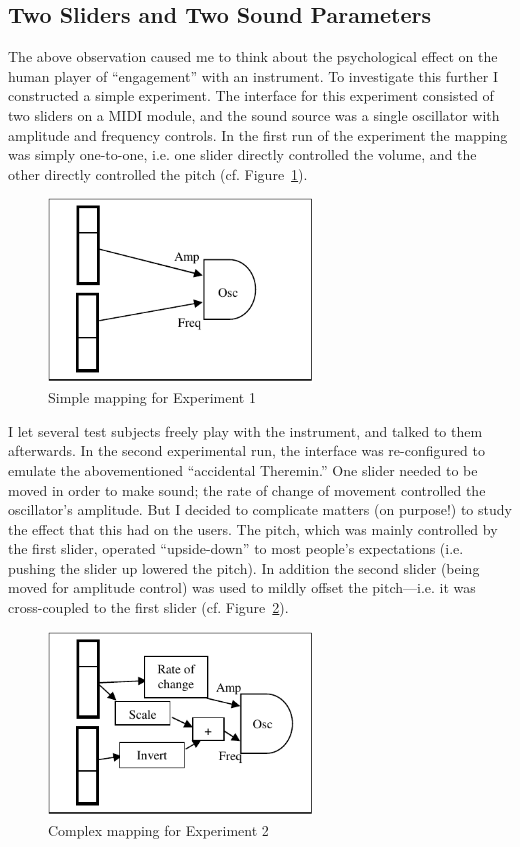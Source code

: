 \subsection{Two Sliders and Two Sound Parameters }

The above observation caused me to think about the psychological effect on the
human player of ``engagement'' with an instrument.
To investigate this further I constructed a simple experiment. The interface for
this experiment consisted of two sliders on a MIDI module, and the sound source
was a single oscillator with amplitude and frequency controls.  In the first run
of the experiment the mapping was simply one-to-one, i.e. one slider directly
controlled the volume, and the other directly controlled the pitch (cf. Figure~\ref{Hunt:img-6}).

\begin{figure}[t]
\centering
\includegraphics[width=70mm]{img-6-eps-converted-to-crop.pdf}
\caption{Simple mapping for Experiment 1}
\label{Hunt:img-6}       %
\end{figure}

I let several test subjects freely play with the instrument, and talked to them
afterwards.  In the second experimental run, the interface was re-configured to
emulate the abovementioned ``accidental Theremin.''  One slider needed to be moved
in order to make sound; the rate of change of movement controlled the
oscillator's amplitude.  But I decided to complicate matters (on purpose!) to
study the effect that this had on the users.  The pitch, which was mainly
controlled by the first slider, operated ``upside-down'' to most people's
expectations (i.e. pushing the slider up lowered the pitch).  In addition the
second slider (being moved for amplitude control) was used to mildly offset the
pitch---i.e. it was cross-coupled to the first slider  (cf. Figure~\ref{Hunt:img-2}).


\begin{figure}[t]
\centering
\includegraphics[width=70mm]{img-2-eps-converted-to-crop.pdf}
\caption{Complex mapping for Experiment 2}
\label{Hunt:img-2}       %
\end{figure}


